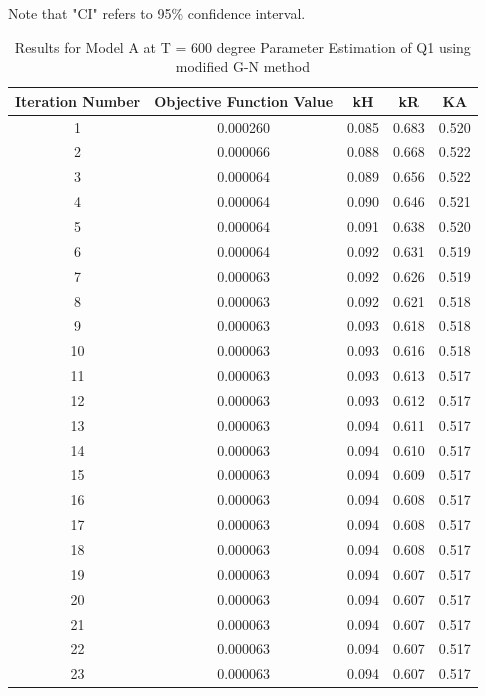 \documentclass[a4paper,12pt]{article} %
\begin{document}
Note that "CI" refers to 95\% confidence interval.
\begin{table}[ht]
\caption{Results for Model A at T = 600 degree Parameter Estimation of Q1 using modified G-N method}
\centering
\begin{tabular}{|c|c|c|c|c|}
    \hline
    Iteration Number & Objective Function Value & kH & kR & KA \\
    \hline
    1 & 0.000260 & 0.085 & 0.683 & 0.520 \\
2 & 0.000066 & 0.088 & 0.668 & 0.522 \\
3 & 0.000064 & 0.089 & 0.656 & 0.522 \\
4 & 0.000064 & 0.090 & 0.646 & 0.521 \\
5 & 0.000064 & 0.091 & 0.638 & 0.520 \\
6 & 0.000064 & 0.092 & 0.631 & 0.519 \\
7 & 0.000063 & 0.092 & 0.626 & 0.519 \\
8 & 0.000063 & 0.092 & 0.621 & 0.518 \\
9 & 0.000063 & 0.093 & 0.618 & 0.518 \\
10 & 0.000063 & 0.093 & 0.616 & 0.518 \\
11 & 0.000063 & 0.093 & 0.613 & 0.517 \\
12 & 0.000063 & 0.093 & 0.612 & 0.517 \\
13 & 0.000063 & 0.094 & 0.611 & 0.517 \\
14 & 0.000063 & 0.094 & 0.610 & 0.517 \\
15 & 0.000063 & 0.094 & 0.609 & 0.517 \\
16 & 0.000063 & 0.094 & 0.608 & 0.517 \\
17 & 0.000063 & 0.094 & 0.608 & 0.517 \\
18 & 0.000063 & 0.094 & 0.608 & 0.517 \\
19 & 0.000063 & 0.094 & 0.607 & 0.517 \\
20 & 0.000063 & 0.094 & 0.607 & 0.517 \\
21 & 0.000063 & 0.094 & 0.607 & 0.517 \\
22 & 0.000063 & 0.094 & 0.607 & 0.517 \\
23 & 0.000063 & 0.094 & 0.607 & 0.517 \\
    \hline
\end{tabular}
\end{table}
\end{document}
